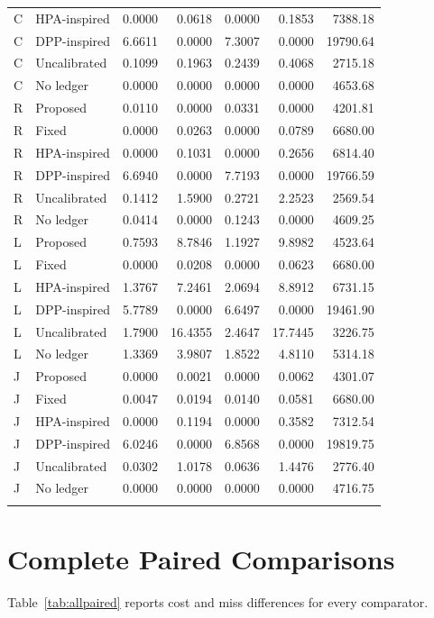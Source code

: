 \documentclass{IEEEoj}
\begin{document}
\begin{table}[!htbp]
\begin{tabular}{llrrrrr}
C & HPA-inspired & 0.0000 & 0.0618 & 0.0000 & 0.1853 & 7388.18 \\
C & DPP-inspired & 6.6611 & 0.0000 & 7.3007 & 0.0000 & 19790.64 \\
C & Uncalibrated & 0.1099 & 0.1963 & 0.2439 & 0.4068 & 2715.18 \\
C & No ledger & 0.0000 & 0.0000 & 0.0000 & 0.0000 & 4653.68 \\
\addlinespace
R & Proposed & 0.0110 & 0.0000 & 0.0331 & 0.0000 & 4201.81 \\
R & Fixed & 0.0000 & 0.0263 & 0.0000 & 0.0789 & 6680.00 \\
R & HPA-inspired & 0.0000 & 0.1031 & 0.0000 & 0.2656 & 6814.40 \\
R & DPP-inspired & 6.6940 & 0.0000 & 7.7193 & 0.0000 & 19766.59 \\
R & Uncalibrated & 0.1412 & 1.5900 & 0.2721 & 2.2523 & 2569.54 \\
R & No ledger & 0.0414 & 0.0000 & 0.1243 & 0.0000 & 4609.25 \\
\addlinespace
L & Proposed & 0.7593 & 8.7846 & 1.1927 & 9.8982 & 4523.64 \\
L & Fixed & 0.0000 & 0.0208 & 0.0000 & 0.0623 & 6680.00 \\
L & HPA-inspired & 1.3767 & 7.2461 & 2.0694 & 8.8912 & 6731.15 \\
L & DPP-inspired & 5.7789 & 0.0000 & 6.6497 & 0.0000 & 19461.90 \\
L & Uncalibrated & 1.7900 & 16.4355 & 2.4647 & 17.7445 & 3226.75 \\
L & No ledger & 1.3369 & 3.9807 & 1.8522 & 4.8110 & 5314.18 \\
\addlinespace
J & Proposed & 0.0000 & 0.0021 & 0.0000 & 0.0062 & 4301.07 \\
J & Fixed & 0.0047 & 0.0194 & 0.0140 & 0.0581 & 6680.00 \\
J & HPA-inspired & 0.0000 & 0.1194 & 0.0000 & 0.3582 & 7312.54 \\
J & DPP-inspired & 6.0246 & 0.0000 & 6.8568 & 0.0000 & 19819.75 \\
J & Uncalibrated & 0.0302 & 1.0178 & 0.0636 & 1.4476 & 2776.40 \\
J & No ledger & 0.0000 & 0.0000 & 0.0000 & 0.0000 & 4716.75 \\
\addlinespace
\bottomrule\end{tabular}\end{table}
\clearpage
\section{Complete Paired Comparisons}
Table~\ref{tab:allpaired} reports cost and miss differences for every comparator.
\end{document}
